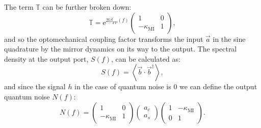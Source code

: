 The term $\mathbb{T}$ can be further broken down:
\begin{equation}
  \mathbb{T} = \text{e}^{2 \text{i} \beta_{\text{FP}} \left( f \right)}
  \begin{pmatrix}
    1 & 0 \\
    -\kappa_{\text{MI}} & 1
  \end{pmatrix},
\end{equation}
and so the optomechanical coupling factor transforms the input $\vec{a}$ in the sine quadrature by the mirror dynamics on its way to the output. The spectral density at the output port, $S \left( f \right)$, can be calculated as:
\begin{equation}
  S \left( f \right) = \left< \vec{b} \cdot \vec{b}^{\dag} \right>,
\end{equation}
and since the signal $h$ in the case of quantum noise is \num{0} we can define the output quantum noise $N \left( f \right)$:
\begin{equation}
  N \left( f \right) =
  \begin{pmatrix}
    1 & 0 \\
    -\kappa_{\text{MI}} & 1
  \end{pmatrix}
  \begin{pmatrix}
    a_c \\
    a_s
  \end{pmatrix}
  \begin{pmatrix}
    1 & -\kappa_{\text{MI}} \\
    0 & 1
  \end{pmatrix}.
\end{equation}

